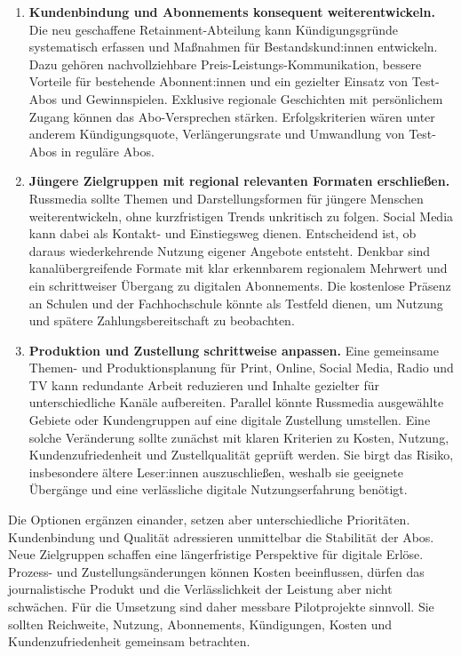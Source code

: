 \begin{enumerate}
  \item \textbf{Kundenbindung und Abonnements konsequent weiterentwickeln.} Die neu geschaffene Retainment-Abteilung kann Kündigungsgründe systematisch erfassen und Maßnahmen für Bestandskund:innen entwickeln. Dazu gehören nachvollziehbare Preis-Leistungs-Kommunikation, bessere Vorteile für bestehende Abonnent:innen und ein gezielter Einsatz von Test-Abos und Gewinnspielen. Exklusive regionale Geschichten mit persönlichem Zugang können das Abo-Versprechen stärken. Erfolgskriterien wären unter anderem Kündigungsquote, Verlängerungsrate und Umwandlung von Test-Abos in reguläre Abos.
  \item \textbf{Jüngere Zielgruppen mit regional relevanten Formaten erschließen.} Russmedia sollte Themen und Darstellungsformen für jüngere Menschen weiterentwickeln, ohne kurzfristigen Trends unkritisch zu folgen. Social Media kann dabei als Kontakt- und Einstiegsweg dienen. Entscheidend ist, ob daraus wiederkehrende Nutzung eigener Angebote entsteht. Denkbar sind kanalübergreifende Formate mit klar erkennbarem regionalem Mehrwert und ein schrittweiser Übergang zu digitalen Abonnements. Die kostenlose Präsenz an Schulen und der Fachhochschule könnte als Testfeld dienen, um Nutzung und spätere Zahlungsbereitschaft zu beobachten.
  \item \textbf{Produktion und Zustellung schrittweise anpassen.} Eine gemeinsame Themen- und Produktionsplanung für Print, Online, Social Media, Radio und TV kann redundante Arbeit reduzieren und Inhalte gezielter für unterschiedliche Kanäle aufbereiten. Parallel könnte Russmedia ausgewählte Gebiete oder Kundengruppen auf eine digitale Zustellung umstellen. Eine solche Veränderung sollte zunächst mit klaren Kriterien zu Kosten, Nutzung, Kundenzufriedenheit und Zustellqualität geprüft werden. Sie birgt das Risiko, insbesondere ältere Leser:innen auszuschließen, weshalb sie geeignete Übergänge und eine verlässliche digitale Nutzungserfahrung benötigt.
\end{enumerate}

Die Optionen ergänzen einander, setzen aber unterschiedliche Prioritäten. Kundenbindung und Qualität adressieren unmittelbar die Stabilität der Abos. Neue Zielgruppen schaffen eine längerfristige Perspektive für digitale Erlöse. Prozess- und Zustellungsänderungen können Kosten beeinflussen, dürfen das journalistische Produkt und die Verlässlichkeit der Leistung aber nicht schwächen. Für die Umsetzung sind daher messbare Pilotprojekte sinnvoll. Sie sollten Reichweite, Nutzung, Abonnements, Kündigungen, Kosten und Kundenzufriedenheit gemeinsam betrachten.
